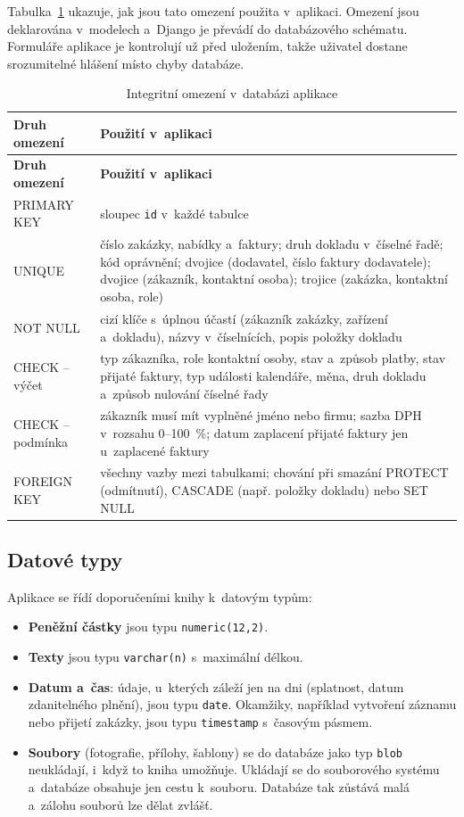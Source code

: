 Tabulka~\ref{tab:principy-omezeni} ukazuje, jak jsou tato omezení použita v~aplikaci. Omezení jsou deklarována v~modelech a~Django je převádí do databázového schématu. Formuláře aplikace je kontrolují už před uložením, takže uživatel dostane srozumitelné hlášení místo chyby databáze.

\begin{longtable}{p{}p{}}
\caption{Integritní omezení v~databázi aplikace}\label{tab:principy-omezeni}\\
\hline \textbf{Druh omezení} & \textbf{Použití v~aplikaci} \\ \hline\endfirsthead
\hline \textbf{Druh omezení} & \textbf{Použití v~aplikaci} \\ \hline\endhead
PRIMARY KEY & sloupec \texttt{id} v~každé tabulce \\
UNIQUE & číslo zakázky, nabídky a~faktury; druh dokladu v~číselné řadě; kód oprávnění; dvojice (dodavatel, číslo faktury dodavatele); dvojice (zákazník, kontaktní osoba); trojice (zakázka, kontaktní osoba, role) \\
NOT NULL & cizí klíče s~úplnou účastí (zákazník zakázky, zařízení a~dokladu), názvy v~číselnících, popis položky dokladu \\
CHECK -- výčet & typ zákazníka, role kontaktní osoby, stav a~způsob platby, stav přijaté faktury, typ události kalendáře, měna, druh dokladu a~způsob nulování číselné řady \\
CHECK --\newline podmínka & zákazník musí mít vyplněné jméno nebo firmu; sazba DPH v~rozsahu 0--100~\%; datum zaplacení přijaté faktury jen u~zaplacené faktury \\
FOREIGN KEY & všechny vazby mezi tabulkami; chování při smazání PROTECT (odmítnutí), CASCADE (např. položky dokladu) nebo SET NULL \\
\hline
\end{longtable}

\subsection{Datové typy}

Aplikace se řídí doporučeními knihy k~datovým typům:
\begin{itemize}
\item \textbf{Peněžní částky} jsou typu \texttt{numeric(12,2)}.
\item \textbf{Texty} jsou typu \texttt{varchar(n)} s~maximální délkou.
\item \textbf{Datum a~čas}: údaje, u~kterých záleží jen na dni (splatnost, datum zdanitelného plnění), jsou typu \texttt{date}. Okamžiky, například vytvoření záznamu nebo přijetí zakázky, jsou typu \texttt{timestamp} s~časovým pásmem.
\item \textbf{Soubory} (fotografie, přílohy, šablony) se do databáze jako typ \texttt{blob} neukládají, i~když to kniha umožňuje. Ukládají se do souborového systému a~databáze obsahuje jen cestu k~souboru. Databáze tak zůstává malá a~zálohu souborů lze dělat zvlášť.
\end{itemize}

